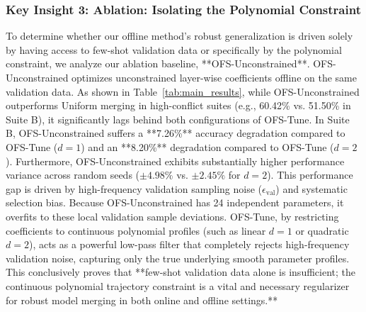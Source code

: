 \subsubsection{Key Insight 3: Ablation: Isolating the Polynomial Constraint}
To determine whether our offline method's robust generalization is driven solely by having access to few-shot validation data or specifically by the polynomial constraint, we analyze our ablation baseline, **OFS-Unconstrained**.
OFS-Unconstrained optimizes unconstrained layer-wise coefficients offline on the same validation data.
As shown in Table~\ref{tab:main_results}, while OFS-Unconstrained outperforms Uniform merging in high-conflict suites (e.g., 60.42\% vs.
51.50\% in Suite B), it significantly lags behind both configurations of OFS-Tune.
In Suite B, OFS-Unconstrained suffers a **7.26\%** accuracy degradation compared to OFS-Tune ($d=1$) and an **8.20\%** degradation compared to OFS-Tune ($d=2$).
Furthermore, OFS-Unconstrained exhibits substantially higher performance variance across random seeds ($\pm 4.98\%$ vs. $\pm 2.45\%$ for $d=2$).
This performance gap is driven by high-frequency validation sampling noise ($\epsilon_{\text{val}}$) and systematic selection bias.
Because OFS-Unconstrained has 24 independent parameters, it overfits to these local validation sample deviations.
OFS-Tune, by restricting coefficients to continuous polynomial profiles (such as linear $d=1$ or quadratic $d=2$), acts as a powerful low-pass filter that completely rejects high-frequency validation noise, capturing only the true underlying smooth parameter profiles.
This conclusively proves that **few-shot validation data alone is insufficient; the continuous polynomial trajectory constraint is a vital and necessary regularizer for robust model merging in both online and offline settings.**

